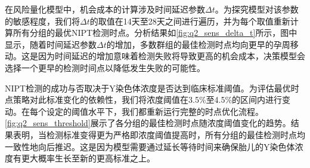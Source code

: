 在风险量化模型中，机会成本的计算涉及时间延迟参数$\Delta t$。为探究模型对该参数的敏感程度，我们将$\Delta t$的取值在14天至28天之间进行遍历，并为每个取值重新计算所有分组的最优NIPT检测时点。分析结果如\cref{fig:q2_sens_delta_t}所示，图中显示，随着时间延迟参数$\Delta t$的增加，多数群组的最佳检测时点均向更早的孕周移动。这是因为时间延迟的增加意味着检测失败将导致更高的机会成本，决策模型会选择一个更早的检测时间点以降低发生失败的可能性。

NIPT检测的成功与否取决于Y染色体浓度是否达到临床标准阈值。为评估最优时点策略对此标准变化的依赖性，我们将浓度阈值在3.5\%至4.5\%的区间内进行变动。在每个设定的阈值水平下，我们都重新运行完整的时点优化流程。\cref{fig:q2_sens_threshold}展示了各分组的最佳检测时点随浓度阈值变化的趋势。结果表明，当检测标准变得更为严格即浓度阈值提高时，所有分组的最佳检测时点均一致性地向后推迟。这是因为模型需要通过延长等待时间来确保胎儿的Y染色体浓度有更大概率生长至新的更高标准之上。